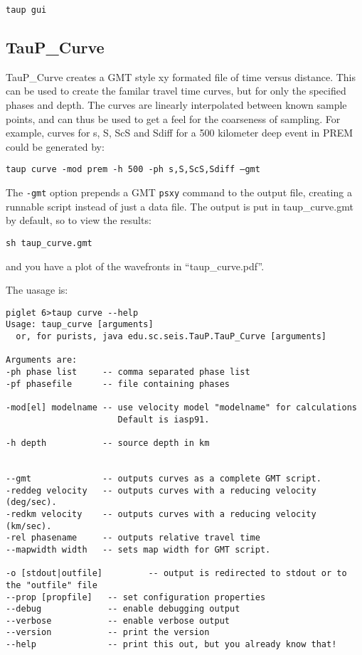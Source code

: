 \texttt{taup gui}

\subsection{TauP\_Curve}
TauP\_Curve creates a GMT style xy formated file of time versus distance.
This can be used to create the familar travel time curves, but for
only the specified phases and depth. The curves are linearly interpolated
between known sample points, and can thus be used to get a feel for the
coarseness of sampling. For example, curves for s, S, ScS and Sdiff
for a 500 kilometer deep event in PREM could be generated by:

\texttt{taup curve -mod prem -h 500 -ph s,S,ScS,Sdiff --gmt}

The \texttt{-gmt} option prepends a GMT \texttt{psxy} command to the output
file, creating a runnable script instead of just a data file.
The output is put in taup\_curve.gmt by default, so to view the results:

\begin{verbatim}
sh taup_curve.gmt
\end{verbatim}

and you have a plot of the wavefronts in ``taup\_curve.pdf''.

The uasage is:
\begin{verbatim}
piglet 6>taup curve --help
Usage: taup_curve [arguments]
  or, for purists, java edu.sc.seis.TauP.TauP_Curve [arguments]

Arguments are:
-ph phase list     -- comma separated phase list
-pf phasefile      -- file containing phases

-mod[el] modelname -- use velocity model "modelname" for calculations
                      Default is iasp91.

-h depth           -- source depth in km


--gmt              -- outputs curves as a complete GMT script.
-reddeg velocity   -- outputs curves with a reducing velocity (deg/sec).
-redkm velocity    -- outputs curves with a reducing velocity (km/sec).
-rel phasename     -- outputs relative travel time
--mapwidth width   -- sets map width for GMT script.

-o [stdout|outfile]         -- output is redirected to stdout or to the "outfile" file
--prop [propfile]   -- set configuration properties
--debug             -- enable debugging output
--verbose           -- enable verbose output
--version           -- print the version
--help              -- print this out, but you already know that!
\end{verbatim}

